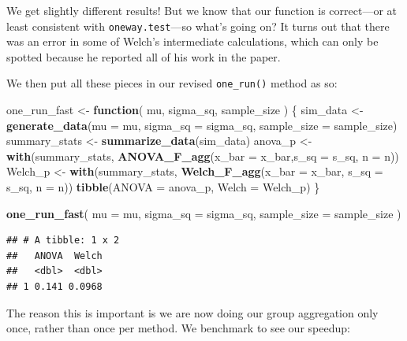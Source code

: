 \documentclass[
]{book}
\newenvironment{Shaded}{\begin{snugshade}}{\end{snugshade}}
\newcommand{\AttributeTok}[1]{\textcolor[rgb]{0.13,0.29,0.53}{#1}}
\newcommand{\ControlFlowTok}[1]{\textcolor[rgb]{0.13,0.29,0.53}{\textbf{#1}}}
\newcommand{\FunctionTok}[1]{\textcolor[rgb]{0.13,0.29,0.53}{\textbf{#1}}}
\newcommand{\NormalTok}[1]{#1}
\newcommand{\OtherTok}[1]{\textcolor[rgb]{0.56,0.35,0.01}{#1}}
\begin{document}
We get slightly different results! But we know that our function is correct---or at least consistent with \texttt{oneway.test}---so what's going on? It turns out that there was an error in some of Welch's intermediate calculations, which can only be spotted because he reported all of his work in the paper.

We then put all these pieces in our revised \texttt{one\_run()} method as so:

\begin{Shaded}
\begin{Highlighting}[]
\NormalTok{one\_run\_fast }\OtherTok{\textless{}{-}} \ControlFlowTok{function}\NormalTok{( mu, sigma\_sq, sample\_size ) \{}
\NormalTok{  sim\_data }\OtherTok{\textless{}{-}} \FunctionTok{generate\_data}\NormalTok{(}\AttributeTok{mu =}\NormalTok{ mu, }\AttributeTok{sigma\_sq =}\NormalTok{ sigma\_sq,}
                            \AttributeTok{sample\_size =}\NormalTok{ sample\_size)}
\NormalTok{  summary\_stats }\OtherTok{\textless{}{-}} \FunctionTok{summarize\_data}\NormalTok{(sim\_data)}
\NormalTok{  anova\_p }\OtherTok{\textless{}{-}} \FunctionTok{with}\NormalTok{(summary\_stats, }
                  \FunctionTok{ANOVA\_F\_agg}\NormalTok{(}\AttributeTok{x\_bar =}\NormalTok{ x\_bar,}\AttributeTok{s\_sq =}\NormalTok{ s\_sq, }\AttributeTok{n =}\NormalTok{ n))}
\NormalTok{  Welch\_p }\OtherTok{\textless{}{-}} \FunctionTok{with}\NormalTok{(summary\_stats, }
                  \FunctionTok{Welch\_F\_agg}\NormalTok{(}\AttributeTok{x\_bar =}\NormalTok{ x\_bar, }\AttributeTok{s\_sq =}\NormalTok{ s\_sq, }\AttributeTok{n =}\NormalTok{ n))}
  \FunctionTok{tibble}\NormalTok{(}\AttributeTok{ANOVA =}\NormalTok{ anova\_p, }\AttributeTok{Welch =}\NormalTok{ Welch\_p)}
\NormalTok{\}}

\FunctionTok{one\_run\_fast}\NormalTok{( }\AttributeTok{mu =}\NormalTok{ mu, }\AttributeTok{sigma\_sq =}\NormalTok{ sigma\_sq,}
              \AttributeTok{sample\_size =}\NormalTok{ sample\_size )}
\end{Highlighting}
\end{Shaded}

\begin{verbatim}
## # A tibble: 1 x 2
##   ANOVA  Welch
##   <dbl>  <dbl>
## 1 0.141 0.0968
\end{verbatim}

The reason this is important is we are now doing our group aggregation only once, rather than once per method.
We benchmark to see our speedup:
\end{document}
